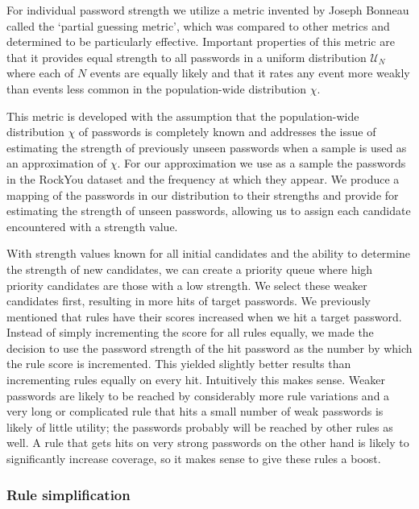 \documentclass{article}
\begin{document}
For individual password strength we utilize a metric invented by Joseph Bonneau
called the `partial guessing metric'\autocite{bonneau2012statistical}, which was
compared to other metrics and determined to be particularly effective.
Important properties of this metric are that it provides equal strength to all
passwords in a uniform distribution $\mathcal{U}_{N}$ %
where each of $N$ events are equally likely and that it rates any event more
weakly than events less common in the population-wide distribution $\chi$.

This metric is developed with the assumption that the population-wide
distribution $\chi$ of passwords is completely known and addresses the issue of
estimating the strength of previously unseen passwords when a sample is used as
an approximation of $\chi$. For our approximation we use as a sample the
passwords in the RockYou dataset and the frequency at which they appear. We
produce a mapping of the passwords in our distribution to their strengths and
provide for estimating the strength of unseen passwords, allowing us to assign
each candidate encountered with a strength value.

With strength values known for all initial candidates and the ability to
determine the strength of new candidates, we can create a priority queue where
high priority candidates are those with a low strength. We select these
weaker candidates first, resulting in more hits of target passwords. We
previously mentioned that rules have their scores increased when we hit a target
password. Instead of simply incrementing the score for all rules equally, we
made the decision to use the password strength of the hit password as the
number by which the rule score is incremented. This yielded slightly better
results than incrementing rules equally on every hit. Intuitively this makes
sense. Weaker passwords are likely to be reached by considerably more rule
variations and a very long or complicated rule that hits a small number of
weak passwords is likely of little utility; the passwords probably will be
reached by other rules as well. A rule that gets hits on very strong passwords
on the other hand is likely to significantly increase coverage, so it makes
sense to give these rules a boost.



\subsubsection{Rule simplification}
\end{document}
